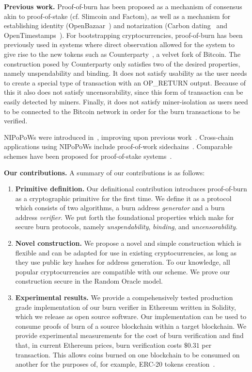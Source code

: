 \noindent
\textbf{Previous work.}
Proof-of-burn has been proposed as a mechanism of consensus akin to
proof-of-stake (cf. Slimcoin and Factom), as well as a mechanism for
establishing identity (OpenBazaar~\cite{zindros2016trust}) and notarization
(Carbon dating~\cite{clark2012commitcoin} and
OpenTimestamps~\cite{todd2016opentimestamps}). For bootstrapping
cryptocurrencies, proof-of-burn has been previously used in systems where direct
observation allowed for the system to give rise to the new tokens such as
Counterparty~\cite{counterparty}, a velvet fork of Bitcoin. The construction posed by Counterparty only satisfies two of the desired properties, namely unspendability and binding. It does not satisfy usability as the user needs to create a special type of transaction with an \textsf{OP\_RETURN} output. Because of this it also does not satisfy uncensorability, since this form of transaction can be easily detected by miners. Finally, it does not satisfy miner-isolation as users need to be connected to the Bitcoin network in order for the burn transactions to be verified.

NIPoPoWs were introduced in~\cite{nipopows}, improving upon previous
work~\cite{popow,highway}. Cross-chain applications using NIPoPoWs include
proof-of-work sidechains~\cite{pow-sidechains}. Comparable schemes have been
proposed for proof-of-stake systems~\cite{pos-sidechains}.

\noindent
\textbf{Our contributions.}
A summary of our contributions is as follows:
\begin{enumerate}[wide, labelwidth=!, labelindent=0pt, label=(\roman*)]
    \item \textbf{Primitive definition.} Our definitional contribution introduces proof-of-burn as a cryptographic primitive for the first time. We
    define it as a protocol which consists of two algorithms, a burn address \emph{generator} and a burn address \emph{verifier}. We put forth the foundational properties which make for secure burn protocols, namely \emph{unspendability}, \emph{binding}, and \emph{uncensorability}.
    \item \textbf{Novel construction.} We propose a novel and simple construction which is flexible and can be adapted for use in existing cryptocurrencies, as long as they use public key hashes for address generation. To our knowledge, all popular cryptocurrencies are
    compatible with our scheme. We prove our construction secure in the Random Oracle model.
    \item \textbf{Experimental results.} We provide a compehensively tested production grade implementation of our burn verifier in Ethereum
    written in Solidity, which we release as open source software. Our implementation can be used to consume proofs of burn of a source blockchain
    within a target blockchain. We provide experimental measurements for the cost of burn verification and find that, in current Ethereum prices,
    burn verification costs $\$0.31$ per transaction.
    This allows coins burned on one blockchain to be consumed on another for the purposes of, for example, ERC-20 tokens creation~\cite{erc20}.
\end{enumerate}

